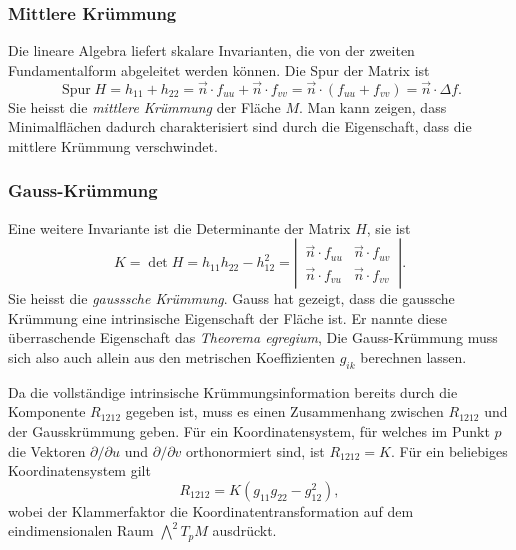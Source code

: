 %
%
\subsubsection{Mittlere Krümmung}
Die lineare Algebra liefert skalare Invarianten, die von der zweiten
Fundamentalform abgeleitet werden können.
Die Spur der Matrix ist
\[
\operatorname{Spur} H
=
h_{11}
+
h_{22}
=
\vec{n}\cdot f_{uu}
+
\vec{n}\cdot f_{vv}
=
\vec{n}\cdot(f_{uu}+f_{vv})
=
\vec{n}\cdot\Delta f.
\]
Sie heisst die \emph{mittlere Krümmung} der Fläche $M$.
Man kann zeigen, dass Minimalflächen dadurch charakterisiert sind
durch die Eigenschaft, dass die mittlere Krümmung verschwindet.

%
%
\subsubsection{Gauss-Krümmung}
Eine weitere Invariante ist die Determinante der Matrix $H$, sie ist
\[
K
=
\det H
=
h_{11}h_{22}-h_{12}^2
=
\left|\,\begin{matrix}
\vec{n}\cdot f_{uu} & \vec{n}\cdot f_{uv} \\
\vec{n}\cdot f_{vu} & \vec{n}\cdot f_{vv}
\end{matrix}\,\right|.
\]
Sie heisst die \emph{gausssche Krümmung}.
Gauss hat gezeigt, dass die gaussche Krümmung eine intrinsische Eigenschaft
der Fläche ist.
Er nannte diese überraschende Eigenschaft das \emph{Theorema egregium}, 
Die Gauss-Krümmung muss sich also auch allein aus den metrischen
Koeffizienten $g_{ik}$ berechnen lassen.

Da die vollständige intrinsische Krümmungsinformation bereits durch die
Komponente $R_{1212}$ gegeben ist, muss es einen Zusammenhang zwischen
$R_{1212}$ und der Gausskrümmung geben.
Für ein Koordinatensystem, für welches im Punkt $p$  die Vektoren
$\partial/\partial u$ und $\partial/\partial v$ orthonormiert sind,
ist $R_{1212}=K$.
Für ein beliebiges Koordinatensystem gilt
\[
R_{1212}
=
K(g_{11}g_{22}-g_{12}^2),
\]
wobei der Klammerfaktor die Koordinatentransformation auf dem 
eindimensionalen Raum $\bigwedge^2 T_pM$ ausdrückt.
